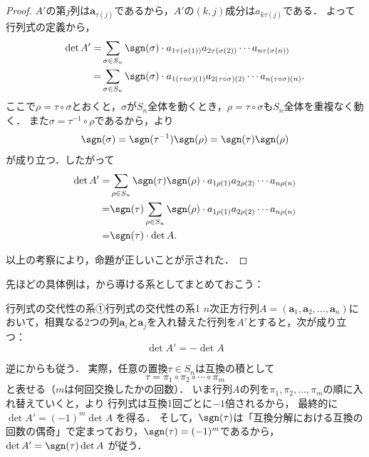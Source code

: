 \begin{leftbar}
  \begin{proof}
    $A'$の第$j$列は$\bm{a}_{\tau(j)}$であるから，$A'$の$(k, j)$成分は$a_{k\tau(j)}$である．
    よって行列式の定義から，
    \begin{align*} 
      \det A ' = & \sum_{\sigma \in S_n} \sgn(\sigma) \cdot a_{1\tau(\sigma(1))} a_{2\tau(\sigma(2))} \dotsm a_{n\tau(\sigma(n))} \\
      = & \sum_{\sigma \in S_n} \sgn(\sigma) \cdot a_{1(\tau \circ \sigma)(1)} a_{2(\tau \circ \sigma)(2)} \dotsm a_{n(\tau \circ \sigma)(n)}.
    \end{align*} 
    ここで$\rho = \tau \circ \sigma$とおくと，$\sigma$が$S_n$全体を動くとき，$\rho = \tau \circ \sigma$も$S_n$全体を重複なく動く．
    また$\sigma = \tau^{-1} \circ \rho$であるから，より
    \[
      \sgn(\sigma) = \sgn(\tau^{-1}) \sgn(\rho) = \sgn(\tau) \sgn(\rho)
    \]
    が成り立つ．したがって
    \begin{align*} 
      \det A ' = & \sum_{\rho \in S_n} \sgn(\tau) \sgn(\rho) \cdot a_{1\rho(1)} a_{2\rho(2)} \dotsm a_{n\rho(n)} \\
      = & \sgn (\tau) \sum_{\rho \in S_n} \sgn(\rho) \cdot a_{1\rho(1)} a_{2\rho(2)} \dotsm a_{n\rho(n)} \\
      = & \sgn (\tau) \cdot \det A.
    \end{align*}

    以上の考察により，命題が正しいことが示された．
  \end{proof}
  \end{leftbar}

  先ほどの具体例は，から導ける系としてまとめておこう：

  \begin{cor}{行列式の交代性の系①}{行列式の交代性の系1}
    $n$次正方行列$A = (\bm{a}_1, \bm{a}_2, \dots, \bm{a}_n)$において，相異なる$2$つの列$\bm{a}_i$と$\bm{a}_j$を入れ替えた行列を$A'$とすると，次が成り立つ：
    \[
    \det A' = - \det A
    \]
  \end{cor}

  逆にからも従う．
  実際，任意の置換$\tau\in S_n$は互換の積として
  \[
  \tau=\pi_1\circ\pi_2\circ\cdots\circ\pi_m
  \]
  と表せる（$m$は何回交換したかの回数）．
  いま行列$A$の列を$\pi_1,\pi_2,\dots,\pi_m$の順に入れ替えていくと，より
  行列式は互換1回ごとに$-1$倍されるから，
  最終的に $\det A' = (-1)^m \det A$ を得る．
  そして，$\sgn(\tau)$は「互換分解における互換の回数の偶奇」で定まっており，$\sgn(\tau)=(-1)^m$であるから，
  $\det A'=\sgn(\tau)\det A$ が従う．

